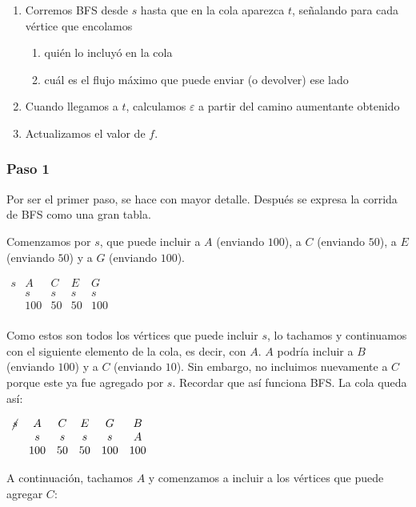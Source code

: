\documentclass[10pt,a4paper]{article}
\begin{document}
\begin{enumerate}

	\item Corremos BFS desde $s$ hasta que en la cola aparezca $t$, señalando para cada vértice que encolamos

	\begin{enumerate}

		\item quién lo incluyó en la cola
		\item cuál es el flujo máximo que puede enviar (o devolver) ese lado
	\end{enumerate}
	
	\item Cuando llegamos a $t$, calculamos $\varepsilon$ a partir del camino aumentante obtenido
	\item Actualizamos el valor de $f$.
\end{enumerate}

\subsubsection*{Paso 1}

Por ser el primer paso, se hace con mayor detalle. Después se expresa la corrida de BFS como una gran tabla.

Comenzamos por $s$, que puede incluir a $A$ (enviando $100$), a $C$ (enviando $50$), a $E$ (enviando $50$) y a $G$ (enviando $100$).

$\begin{array}{ccccc} s & A & C & E &G \\ & s & s & s & s \\ & 100 & 50 & 50 & 100\\ \end{array}$

Como estos son todos los vértices que puede incluir $s$, lo tachamos y continuamos con el siguiente elemento de la cola, es decir, con $A$. $A$ podría incluir a $B$ (enviando $100$) y a $C$ (enviando $10$). Sin embargo, no incluimos nuevamente a $C$ porque este ya fue agregado por $s$. Recordar que así funciona BFS. La cola queda así:

$\begin{array}{cccccc} \cancel{s} & A & C & E &G & B \\ & s & s & s & s & A \\ & 100 & 50 & 50 & 100 & 100 \end{array}$

A continuación, tachamos $A$ y comenzamos a incluir a los vértices que puede agregar $C$:
\end{document}
